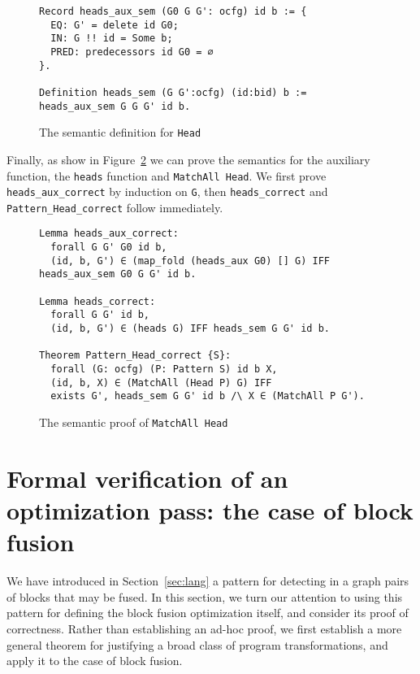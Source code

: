 \documentclass[11pt]{article}
\newcommand{\inlinecoq}[1]{\mbox{\lstinline[style=customcoq,columns=fixed,basewidth=.48em]{#1}}}
\newcommand{\ilc}[1]{\inlinecoq{#1}}
\newcommand{\yzt}[1]{\textcolor{ForestGreen!50}{#1}}
\newcommand{\cut}[1]{\textcolor{Gray!40}{#1}}
\begin{document}
\begin{figure}
  \begin{lstlisting}[style=customcoq,basicstyle=\small\ttfamily]
Record heads_aux_sem (G0 G G': ocfg) id b := {
  EQ: G' = delete id G0;
  IN: G !! id = Some b;
  PRED: predecessors id G0 = ∅
}.

Definition heads_sem (G G':ocfg) (id:bid) b := heads_aux_sem G G G' id b.
  \end{lstlisting}
  \caption{The semantic definition for \ilc{Head}}
  \label{fig:sem_head_def}
\end{figure}

Finally, as show in Figure~\ref{fig:head_cor} we can prove the semantics for the auxiliary function, the \ilc{heads} function and \ilc{MatchAll Head}. We first prove \ilc{heads_aux_correct} by induction on \ilc{G}, then \ilc{heads_correct} and \ilc{Pattern_Head_correct} follow immediately.

\begin{figure}
  \begin{lstlisting}[style=customcoq,basicstyle=\small\ttfamily]
Lemma heads_aux_correct:
  forall G G' G0 id b,
  (id, b, G') ∈ (map_fold (heads_aux G0) [] G) IFF heads_aux_sem G0 G G' id b.

Lemma heads_correct:
  forall G G' id b,
  (id, b, G') ∈ (heads G) IFF heads_sem G G' id b.

Theorem Pattern_Head_correct {S}:
  forall (G: ocfg) (P: Pattern S) id b X,
  (id, b, X) ∈ (MatchAll (Head P) G) IFF
  exists G', heads_sem G G' id b /\ X ∈ (MatchAll P G').
  \end{lstlisting}
  \caption{The semantic proof of \ilc{MatchAll Head}}
  \label{fig:head_cor}
\end{figure}

\section{Formal verification of an optimization pass: the case of block fusion}
\label{sec:deno}

\yzt{We have introduced in Section~\ref{sec:lang} a pattern for detecting in a graph pairs of blocks that may be fused. In this section, we turn our attention to using this pattern for defining the block fusion optimization itself, and consider its proof of correctness. Rather than establishing an ad-hoc proof, we first establish a more general theorem for justifying a broad class of program transformations, and apply it to the case of block fusion.}
\end{document}
